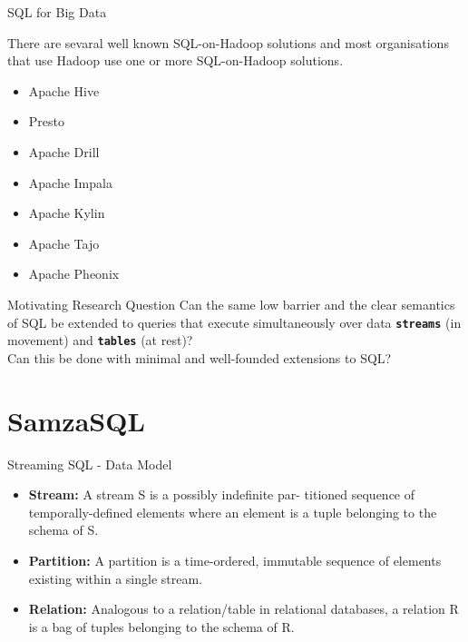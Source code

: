 \documentclass[newPxFont]{beamer}
\begin{document}
\begin{frame}{SQL for Big Data}

There are sevaral well known SQL-on-Hadoop solutions and most organisations that use Hadoop use one or more SQL-on-Hadoop solutions.

\begin{itemize}
	\item Apache Hive
	\item Presto
	\item Apache Drill
	\item Apache Impala
	\item Apache Kylin
	\item Apache Tajo
	\item Apache Pheonix
\end{itemize}

\end{frame}



\begin{frame}{Motivating Research Question}
\Large{Can the same low barrier and the clear semantics of SQL be extended to queries that execute simultaneously over data \texttt{\textbf{streams}} (in movement) and \texttt{\textbf{tables}} (at rest)?} \\

\Large{Can this be done with minimal and well-founded extensions to SQL?}
\end{frame}
%
%

\section{SamzaSQL}


\begin{frame}[c]{Streaming SQL - Data Model}

\begin{itemize}
	\item \textbf{Stream:} A stream S is a possibly indefinite par- titioned sequence of temporally-defined elements where an element is a tuple belonging to the schema of S.
	\item \textbf{Partition:} A partition is a time-ordered, immutable sequence of elements existing within a single stream.
	\item \textbf{Relation:} Analogous to a relation/table in relational databases, a relation R is a bag of tuples belonging to the schema of R. 
\end{itemize}

\end{frame}
\end{document}
